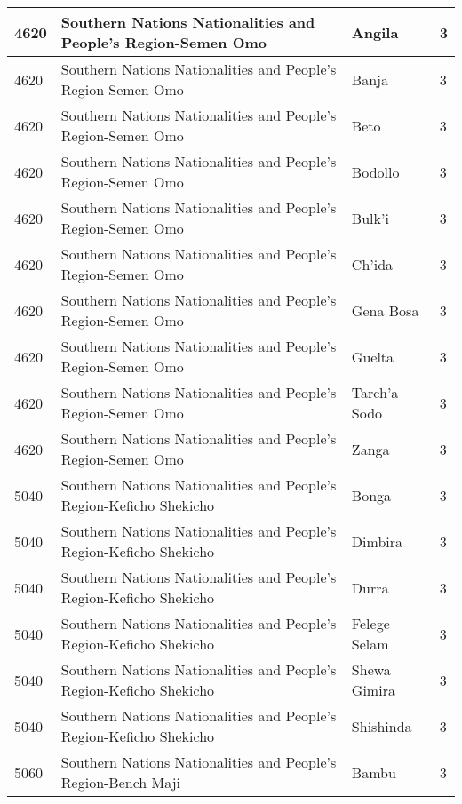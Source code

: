 \documentclass[12pt,a4paper,openbib,titlepage]{report}
\begin{document}
\begin{longtable}{|p{2cm}|p{6.5cm}|p{8cm}|p{1.5cm}|}
\hline 
\rule[-1ex]{0pt}{2.5ex} 4620 & Southern Nations Nationalities and People's Region-Semen Omo & Angila & 3 \\
\hline 
\rule[-1ex]{0pt}{2.5ex} 4620 & Southern Nations Nationalities and People's Region-Semen Omo & Banja & 3 \\
\hline 
\rule[-1ex]{0pt}{2.5ex} 4620 & Southern Nations Nationalities and People's Region-Semen Omo & Beto & 3 \\
\hline 
\rule[-1ex]{0pt}{2.5ex} 4620 & Southern Nations Nationalities and People's Region-Semen Omo & Bodollo & 3 \\
\hline 
\rule[-1ex]{0pt}{2.5ex} 4620 & Southern Nations Nationalities and People's Region-Semen Omo & Bulk'i & 3 \\
\hline 
\rule[-1ex]{0pt}{2.5ex} 4620 & Southern Nations Nationalities and People's Region-Semen Omo & Ch'ida & 3 \\
\hline 
\rule[-1ex]{0pt}{2.5ex} 4620 & Southern Nations Nationalities and People's Region-Semen Omo & Gena Bosa & 3 \\
\hline 
\rule[-1ex]{0pt}{2.5ex} 4620 & Southern Nations Nationalities and People's Region-Semen Omo & Guelta & 3 \\
\hline 
\rule[-1ex]{0pt}{2.5ex} 4620 & Southern Nations Nationalities and People's Region-Semen Omo & Tarch'a Sodo & 3 \\
\hline 
\rule[-1ex]{0pt}{2.5ex} 4620 & Southern Nations Nationalities and People's Region-Semen Omo & Zanga & 3 \\
\hline 
\rule[-1ex]{0pt}{2.5ex} 5040 & Southern Nations Nationalities and People's Region-Keficho Shekicho & Bonga & 3 \\
\hline 
\rule[-1ex]{0pt}{2.5ex} 5040 & Southern Nations Nationalities and People's Region-Keficho Shekicho & Dimbira & 3 \\
\hline 
\rule[-1ex]{0pt}{2.5ex} 5040 & Southern Nations Nationalities and People's Region-Keficho Shekicho & Durra & 3 \\
\hline 
\rule[-1ex]{0pt}{2.5ex} 5040 & Southern Nations Nationalities and People's Region-Keficho Shekicho & Felege Selam & 3 \\
\hline 
\rule[-1ex]{0pt}{2.5ex} 5040 & Southern Nations Nationalities and People's Region-Keficho Shekicho & Shewa Gimira & 3 \\
\hline 
\rule[-1ex]{0pt}{2.5ex} 5040 & Southern Nations Nationalities and People's Region-Keficho Shekicho & Shishinda & 3 \\
\hline 
\rule[-1ex]{0pt}{2.5ex} 5060 & Southern Nations Nationalities and People's Region-Bench Maji & Bambu & 3 \\

\end{longtable}
\end{document}
